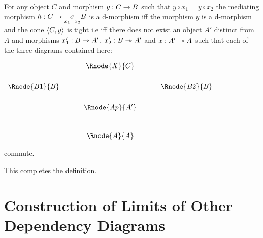 \documentclass[10pt,a4paper]{scrartcl}
\begin{document}
\begin{enumerate} [(i)]
\noindent For any object $C$ and morphism $y: C \rightarrow B$ such that
$y \circ x_1 = y \circ x_2$
the mediating morphism $h: C \rightarrow \underset{x_1=x_2}{\sigma}B$ is a d-morphism iff 
the morphism $y$ is a d-morphism and the cone $\langle C,y\rangle$ is tight i.e iff there does not exist an object $A'$ distinct from 
$A$ and morphisms $x'_1: B \rightarrowtriangle A'$, $x'_2: B \rightarrowtriangle A'$ and $x:A' \rightarrowtriangle A$ such that each of the three diagrams contained here:

\begin{center}
$
\begin{array}{cp{0.5cm}cp{0.5cm}c}
               && \Rnode{X}{C}&&                  \\ [0.6cm]
\Rnode{B1}{B}&&                  && \Rnode{B2}{B} \\ [0.6cm]
               &&\Rnode{Ap}{A'}  &&               \\ [1cm]
               &&\Rnode{A}{A}    && 
\end{array}
$
\end{center}

\noindent commute. \\
\fi

\noindent This completes the definition.

\end{enumerate}

\section{Construction of Limits of Other Dependency Diagrams}
\end{document}
